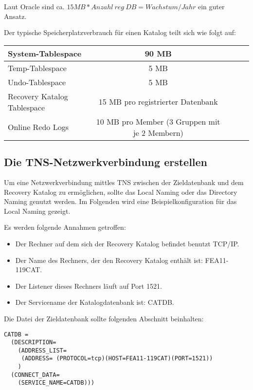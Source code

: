        \begin{merke}
          Laut Oracle sind ca. $15 MB * Anzahl\ reg\ DB = Wachstum/Jahr$ ein guter Ansatz.
        \end{merke}
        Der typische Speicherplatzverbrauch für einen Katalog teilt sich wie folgt auf:
        \begin{center}
          \tabletail{%
            \hline
          }
          \begin{supertabular}[h]{|l|c|c|c|p{7cm}|}
          System-Tablespace & 90 MB \\
          \hline
          Temp-Tablespace & 5 MB \\
          \hline
          Undo-Tablespace & 5 MB \\
          \hline
          Recovery Katalog Tablespace & 15 MB pro registrierter Datenbank \\
          \hline
          Online Redo Logs & 10 MB pro Member (3 Gruppen mit je 2 Membern) \\
          \end{supertabular}
        \end{center}
      \subsection{Die TNS-Netzwerkverbindung erstellen}
        Um eine Netzwerkverbindung mittles TNS zwischen der Zieldatenbank und dem Recovery Katalog zu ermöglichen, sollte das Local Naming oder das Directory Naming genutzt werden. Im Folgenden wird eine Beispielkonfiguration für das Local Naming gezeigt.

        Es werden folgende Annahmen getroffen:
        \begin{itemize}
          \item Der Rechner auf dem sich der Recovery Katalog befindet benutzt TCP/IP.
          \item Der Name des Rechners, der den Recovery Katalog enthält ist: FEA11-119CAT.
          \item Der Listener dieses Rechners läuft auf Port 1521.
          \item Der Servicename der Katalogdatenbank ist: CATDB.
        \end{itemize}
        Die Datei  der Zieldatenbank sollte folgenden Abschnitt beinhalten:
        \begin{lstlisting}[caption={Der Net Service Name der CATDB},label=admin1200,language=configfile]
CATDB =
  (DESCRIPTION=
    (ADDRESS_LIST=
     (ADDRESS= (PROTOCOL=tcp)(HOST=FEA11-119CAT)(PORT=1521))
    )
  (CONNECT_DATA=
    (SERVICE_NAME=CATDB)))
        \end{lstlisting}
